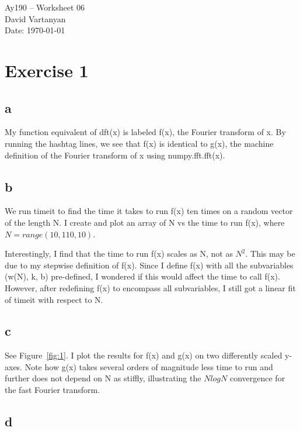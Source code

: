 \documentclass[11pt,letterpaper]{article}
\begin{document}
\begin{center}
\Large
Ay190 -- Worksheet 06\\
David Vartanyan\\
Date: \today
\end{center}

\section{Exercise 1}

\subsection{a}


My function equivalent of dft(x) is labeled f(x), the Fourier transform of x. By running the hashtag lines, we see that f(x) is identical to g(x), the machine definition of the Fourier transform of x using numpy.fft.fft(x).

\subsection{b} \label{sec:b}

We run timeit to find the time it takes to run f(x) ten times on a random vector of the length N. I create and plot an array of N vs the time to run f(x), where $N=range(10,110,10)$.

Interestingly, I find that the time to run f(x) scales as N, not as $N^2$. This may be due to my stepwise definition of f(x). Since I define f(x) with all the subvariables (w(N), k, b) pre-defined, I wondered if this would affect the time to call f(x). However, after redefining f(x) to encompass all subvariables, I still got a linear fit of timeit with respect to N.

\subsection{c}

See Figure~\ref{fig:1}. I plot the results for f(x) and g(x) on two differently scaled y-axes. Note how g(x) takes several orders of magnitude less time to run and further does not depend on N as stiffly, illustrating the $N log N$ convergence for the fast Fourier transform. 

\subsection{d}
\end{document}
